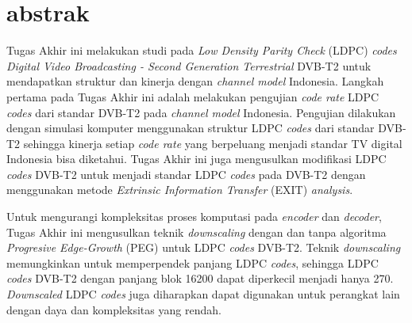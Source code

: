 
\chapter*{abstrak}
\vspace*{0.7cm}



Tugas Akhir ini melakukan studi pada \textit{Low Density Parity Check} (LDPC) \textit{codes} \textit{Digital Video Broadcasting - Second Generation Terrestrial} DVB-T2 untuk mendapatkan struktur dan kinerja dengan \textit{channel model} Indonesia. Langkah pertama pada Tugas Akhir ini adalah melakukan pengujian \textit{code rate} LDPC \textit{codes} dari standar DVB-T2 pada \textit{channel model} Indonesia. Pengujian dilakukan dengan simulasi komputer menggunakan struktur LDPC \textit{codes} dari standar DVB-T2 sehingga kinerja setiap \textit{code rate} yang berpeluang menjadi standar TV digital Indonesia bisa diketahui. Tugas Akhir ini juga mengusulkan modifikasi LDPC \textit{codes} DVB-T2 untuk menjadi standar LDPC \textit{codes} pada DVB-T2  dengan menggunakan metode \textit{Extrinsic Information Transfer} (EXIT) \textit{analysis}.


	Untuk mengurangi kompleksitas proses komputasi pada \textit{encoder} dan \textit{decoder}, Tugas Akhir ini mengusulkan teknik \textit{downscaling} dengan dan tanpa algoritma \textit{Progresive Edge-Growth} (PEG) untuk LDPC \textit{codes} DVB-T2. Teknik \textit{downscaling} memungkinkan untuk memperpendek panjang LDPC \textit{codes}, sehingga LDPC \textit{codes} DVB-T2 dengan panjang blok 16200 dapat diperkecil menjadi hanya 270. \textit{Downscaled} LDPC \textit{codes} juga diharapkan dapat digunakan untuk perangkat lain dengan daya dan kompleksitas yang rendah.


